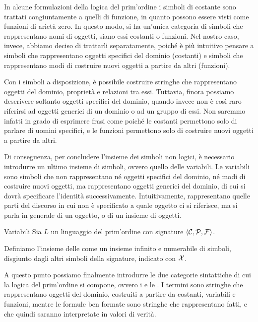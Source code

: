 In alcune formulazioni della logica del prim'ordine i simboli di costante sono trattati congiuntamente a quelli di funzione, in quanto possono essere visti come funzioni di arietà zero. In questo modo, si ha un'unica categoria di simboli che rappresentano nomi di oggetti, siano essi costanti o funzioni. Nel nostro caso, invece, abbiamo deciso di trattarli separatamente, poiché è più intuitivo pensare a simboli che rappresentano oggetti specifici del dominio (costanti) e simboli che rappresentano modi di costruire nuovi oggetti a partire da altri (funzioni).

Con i simboli a disposizione, è possibile costruire stringhe che rappresentano oggetti del dominio, proprietà e relazioni tra essi. Tuttavia, finora possiamo descrivere soltanto oggetti specifici del dominio, quando invece non è così raro riferirsi ad oggetti generici di un dominio o ad un gruppo di essi. Non saremmo infatti in grado di esprimere frasi come  poiché le costanti permettono solo di parlare di uomini specifici, e le funzioni permettono solo di costruire nuovi oggetti a partire da altri.

Di conseguenza, per concludere l'insieme dei simboli non logici, è necessario introdurre un ultimo insieme di simboli, ovvero quello delle variabili. Le variabili sono simboli che non rappresentano né oggetti specifici del dominio, né modi di costruire nuovi oggetti, ma rappresentano oggetti generici del dominio, di cui si dovrà specificare l'identità successivamente. Intuitivamente, rappresentano quelle parti del discorso in cui non è specificato a quale oggetto ci si riferisce, ma si parla in generale di un oggetto, o di un insieme di oggetti.

\begin{definition}{Variabili}
  Sia \(L\) un linguaggio del prim'ordine con signature \(\langle \mathcal{C}, \mathcal{P}, \mathcal{F} \rangle\). 
  
  Definiamo l'insieme delle  come un insieme infinito e numerabile di simboli, disgiunto dagli altri simboli della signature, indicato con \(\mathcal{X}\).
\end{definition}

A questo punto possiamo finalmente introdurre le due categorie sintattiche di cui la logica del prim'ordine si compone, ovvero i  e le . I termini sono stringhe che rappresentano oggetti del dominio, costruiti a partire da costanti, variabili e funzioni, mentre le formule ben formate sono stringhe che rappresentano fatti, e che quindi saranno interpretate in valori di verità.

